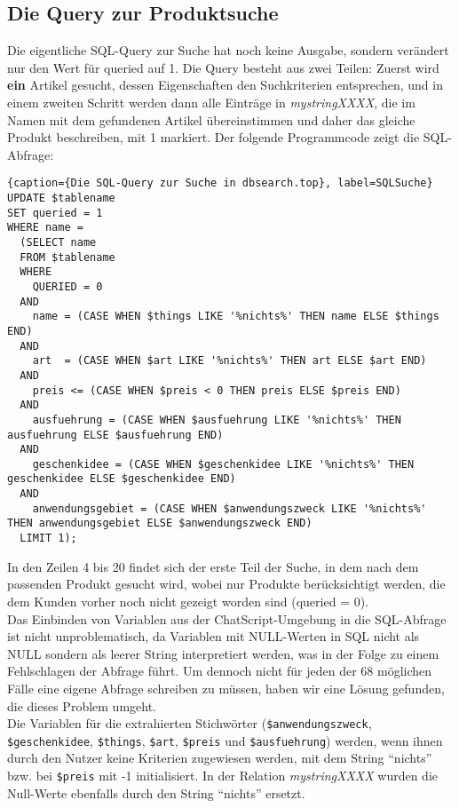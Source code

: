 \subsection{Die Query zur Produktsuche}
\label{sec:Produktsuche}
Die eigentliche SQL-Query zur Suche hat noch keine Ausgabe, sondern verändert nur den Wert für queried auf 1. Die Query besteht aus zwei Teilen: Zuerst wird \textbf{ein} Artikel gesucht, dessen Eigenschaften den Suchkriterien entsprechen, und in einem zweiten Schritt werden dann alle Einträge in \textit{mystringXXXX}, die im Namen mit dem gefundenen Artikel übereinstimmen und daher das gleiche Produkt beschreiben, mit 1 markiert. Der folgende Programmcode zeigt die SQL-Abfrage:\\
\begin{lstlisting}{caption={Die SQL-Query zur Suche in dbsearch.top}, label=SQLSuche}
UPDATE $tablename
SET queried = 1
WHERE name =
  (SELECT name
  FROM $tablename
  WHERE
    QUERIED = 0
  AND
    name = (CASE WHEN $things LIKE '%nichts%' THEN name ELSE $things END)
  AND
    art  = (CASE WHEN $art LIKE '%nichts%' THEN art ELSE $art END)
  AND
    preis <= (CASE WHEN $preis < 0 THEN preis ELSE $preis END)
  AND
    ausfuehrung = (CASE WHEN $ausfuehrung LIKE '%nichts%' THEN ausfuehrung ELSE $ausfuehrung END)
  AND
    geschenkidee = (CASE WHEN $geschenkidee LIKE '%nichts%' THEN geschenkidee ELSE $geschenkidee END)
  AND
    anwendungsgebiet = (CASE WHEN $anwendungszweck LIKE '%nichts%' THEN anwendungsgebiet ELSE $anwendungszweck END)
  LIMIT 1); 
\end{lstlisting}
In den Zeilen 4 bis 20 findet sich der erste Teil der Suche, in dem nach dem passenden Produkt gesucht wird, wobei nur Produkte berücksichtigt werden, die dem Kunden vorher noch nicht gezeigt worden sind (queried = 0).\\
Das Einbinden von Variablen aus der ChatScript-Umgebung in die SQL-Abfrage ist nicht unproblematisch, da Variablen mit NULL-Werten in SQL nicht als NULL sondern als leerer String interpretiert werden, was in der Folge zu einem Fehlschlagen der Abfrage führt. Um dennoch nicht für jeden der 68 möglichen Fälle eine eigene Abfrage schreiben zu müssen, haben wir eine Lösung gefunden, die dieses Problem umgeht.\\
Die Variablen für die extrahierten Stichwörter (\lstinline|$anwendungszweck|, \lstinline|$geschenkidee|, \lstinline|$things|, \lstinline|$art|, \lstinline|$preis| und \lstinline|$ausfuehrung|) werden, wenn ihnen durch den Nutzer keine Kriterien zugewiesen werden, mit dem String "`nichts"' bzw. bei \lstinline|$preis| mit -1 initialisiert. In der Relation \textit{mystringXXXX} wurden die Null-Werte ebenfalls durch den String "`nichts"' ersetzt.\\ 
